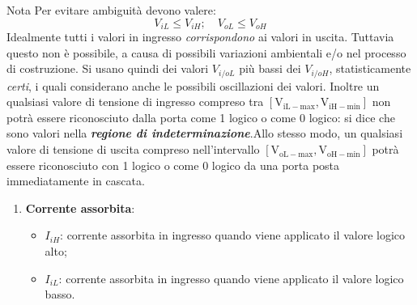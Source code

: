 \documentclass[
]{book}
\providecommand{\tightlist}{%
  \setlength{\itemsep}{0pt}\setlength{\parskip}{0pt}}
\begin{document}
\begin{orangebox}{Nota}
Per evitare ambiguità devono valere:
$$
V_{iL}\leq V_{iH}; \quad V_{oL}\leq V_{oH}
$$
Idealmente tutti i valori in ingresso \emph{corrispondono} ai valori in uscita. Tuttavia questo non è possibile, a causa di possibili variazioni ambientali e/o nel processo di costruzione. Si usano quindi dei valori $V_{i/o L}$ più bassi dei $V_{i/oH}$, statisticamente \emph{certi}, i quali considerano anche le possibili oscillazioni dei valori. \newline
Inoltre un qualsiasi valore di tensione di ingresso compreso tra $\left[\mathrm{V}_{\mathrm{iL-max}},\mathrm{V}_{\mathrm{iH-min}}\right]$ non potrà essere riconosciuto dalla porta come 1 logico o come 0 logico: si dice che sono valori nella \emph{\textbf{regione di indeterminazione}}.\newline Allo stesso modo, un qualsiasi valore di tensione di uscita compreso nell'intervallo $[\mathrm{V}_{\mathrm{oL-max}},\mathrm{V}_{\mathrm{oH-min}}]$ potrà essere riconosciuto con 1 logico o come 0 logico da una porta posta immediatamente in cascata.
\begin{minipage}{\linewidth}
\centering
{}%
\end{minipage}
\end{orangebox}

\begin{enumerate}
\def\labelenumi{\arabic{enumi})}
\setcounter{enumi}{2}
\tightlist
\item
  \textbf{Corrente assorbita}:

  \begin{itemize}
  \tightlist
  \item
    \(I_{iH}\): corrente assorbita in ingresso quando viene applicato il
    valore logico alto;
  \item
    \(I_{iL}\): corrente assorbita in ingresso quando viene applicato il
    valore logico basso.
  \end{itemize}
\end{enumerate}
\end{document}
